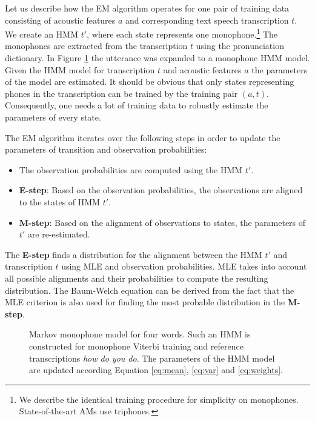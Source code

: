 
Let us describe how the \ac{EM} algorithm operates for one pair of training data consisting of acoustic features $a$ and corresponding text speech transcription $t$. We create an \ac{HMM} $t'$, where each state represents one monophone.\footnote{We describe the identical training procedure for simplicity on monophones. State-of-the-art \acp{AM} use triphones.} The monophones are extracted from the transcription $t$ using the pronunciation dictionary. In Figure \ref{fig:hmm_words} the utterance  was expanded to a monophone \ac{HMM} model. Given the \ac{HMM} model for transcription $t$ and acoustic features $a$ the parameters of the model are estimated. It should be obvious that only states representing phones in the transcription can be trained by the training pair $(a, t)$. Consequently, one needs a lot of training data to robustly estimate the parameters of every state.

The \ac{EM} algorithm iterates over the following steps in order to update the parameters of transition and observation probabilities:

\begin{itemize}
    \item The observation probabilities are computed using the \ac{HMM} $t'$. 
    \item {\bf E-step}: Based on the observation probabilities, the observations are aligned to the states of \ac{HMM} $t'$. 
    \item {\bf M-step}: Based on the alignment of observations to states, the parameters of $t'$ are re-estimated. 
\end{itemize}

The {\bf E-step} finds a distribution for the alignment between the \ac{HMM} $t'$ and transcription $t$ using \ac{MLE}\cite{gopinath1998maximum} and observation probabilities. \ac{MLE} takes into account all possible alignments and their probabilities to compute the resulting distribution. The Baum-Welch equation can be derived from the fact that the \ac{MLE} criterion is also used for finding the most probable distribution in the {\bf M-step}.\cite{huang2001spoken} %

\begin{figure}[!htp]
    \begin{center}
    
    \caption{Markov monophone model for four words. Such an \ac{HMM} is constructed for monophone Viterbi training and reference transcriptions \textit{how do you do}. The parameters of the \ac{HMM} model are updated according Equation \ref{eq:mean}, \ref{eq:var} and \ref{eq:weights}.}
    \label{fig:hmm_words} 
    \end{center}
\end{figure}

